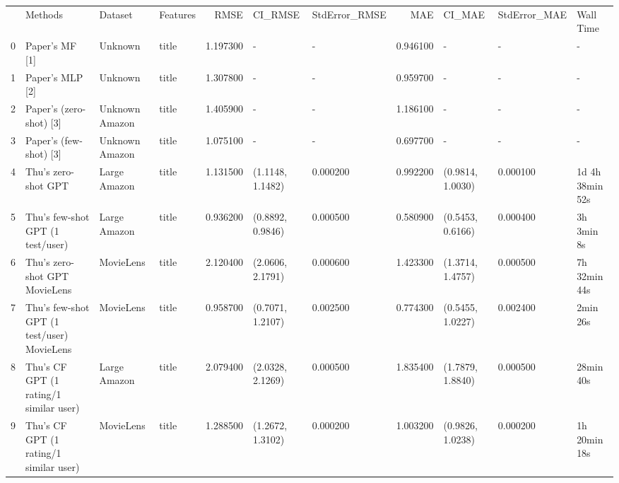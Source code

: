 \begin{tabular}{llllrllrlll}
 & Methods & Dataset & Features & RMSE & CI_RMSE & StdError_RMSE & MAE & CI_MAE & StdError_MAE & Wall Time \\
0 & Paper's MF [1] & Unknown & title & 1.197300 & - & - & 0.946100 & - & - & - \\
1 & Paper's MLP [2] & Unknown & title & 1.307800 & - & - & 0.959700 & - & - & - \\
2 & Paper's (zero-shot) [3] & Unknown Amazon & title & 1.405900 & - & - & 1.186100 & - & - & - \\
3 & Paper's (few-shot) [3] & Unknown Amazon & title & 1.075100 & - & - & 0.697700 & - & - & - \\
4 & Thu's zero-shot GPT & Large Amazon & title & 1.131500 & (1.1148, 1.1482) & 0.000200 & 0.992200 & (0.9814, 1.0030) & 0.000100 & 1d 4h 38min 52s \\
5 & Thu's few-shot GPT (1 test/user) & Large Amazon & title & 0.936200 & (0.8892, 0.9846) & 0.000500 & 0.580900 & (0.5453, 0.6166) & 0.000400 & 3h 3min 8s \\
6 & Thu's zero-shot GPT MovieLens & MovieLens & title & 2.120400 & (2.0606, 2.1791) & 0.000600 & 1.423300 & (1.3714, 1.4757) & 0.000500 & 7h 32min 44s \\
7 & Thu's few-shot GPT (1 test/user) MovieLens & MovieLens & title & 0.958700 & (0.7071, 1.2107) & 0.002500 & 0.774300 & (0.5455, 1.0227) & 0.002400 & 2min 26s \\
8 & Thu's CF GPT (1 rating/1 similar user) & Large Amazon & title & 2.079400 & (2.0328, 2.1269) & 0.000500 & 1.835400 & (1.7879, 1.8840) & 0.000500 & 28min 40s \\
9 & Thu's CF GPT (1 rating/1 similar user) & MovieLens & title & 1.288500 & (1.2672, 1.3102) & 0.000200 & 1.003200 & (0.9826, 1.0238) & 0.000200 & 1h 20min 18s \\
\end{tabular}
